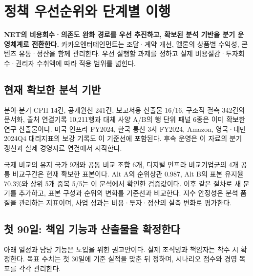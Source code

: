 \documentclass[11pt,a4paper]{report}
\begin{document}
\section{정책 우선순위와 단계별 이행}
\label{sec:execution_roadmap}
\textbf{NET의 비용회수·의존도 완화 경로를 우선 추진하고, 확보된 분석 기반을 분기 운영체계로 전환한다.} 카카오엔터테인먼트는 조달·계약 개선, 멜론의 상품별 수익성, 콘텐츠 유통·정산을 함께 관리한다. 우선 실행할 과제를 정하고 실제 비용절감·투자회수·권리자 수취액에 따라 적용 범위를 넓힌다.

\subsection{현재 확보한 분석 기반}
분야-분기 CPII 14건, 공개원천 241건, 보고서용 산출물 16/16, 구조적 결측 342건의 문서화, 출처 연결기록 10{,}211행과 대체 사양 A/B의 행 단위 패널 6종은 이미 확보한 연구 산출물이다. 미국 인프라 FY2024, 한국 통신 3사 FY2024, Amazon, 영국·대만 2024Q4 대리지표의 보강 기록도 이 기준선에 포함된다. 후속 운영은 이 자료의 분기 갱신과 실제 경영자료 연결에서 시작한다.

국제 비교의 유지 국가 9개와 공통 비교 조합 6개, 디지털 인프라 비교기업군의 4개 공통 비교구간은 현재 확보한 표본이다. Alt A의 순위상관 0.987, Alt B의 표본 유지율 70.3\%와 상위 5개 중복 5/5는 이 분석에서 확인한 검증값이다. 이후 같은 절차로 새 분기를 추가하고, 표본 구성과 순위의 변화를 기준선과 비교한다. 지수 안정성은 분석 품질을 관리하는 지표이며, 사업 성과는 비용·투자·정산의 실측 변화로 평가한다.

\subsection{첫 90일: 책임 기능과 산출물을 확정한다}
아래 일정과 담당 기능은 도입을 위한 권고안이다. 실제 조직명과 책임자는 착수 시 확정한다. 목표 수치는 첫 30일에 기준 실적을 맞춘 뒤 정하며, 시나리오 점수와 경영 목표를 각각 관리한다.
\end{document}

